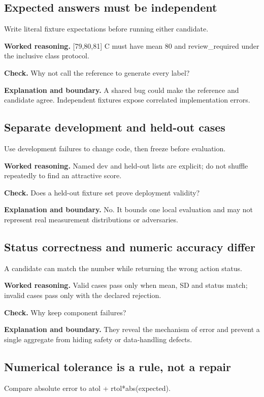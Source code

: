 \subsection{Expected answers must be independent}
Write literal fixture expectations before running either candidate.

\textbf{Worked reasoning.} [79,80,81] C must have mean 80 and review\_required under the inclusive class protocol.

\textbf{Check.} Why not call the reference to generate every label?

\textbf{Explanation and boundary.} A shared bug could make the reference and candidate agree. Independent fixtures expose correlated implementation errors.

\subsection{Separate development and held-out cases}
Use development failures to change code, then freeze before evaluation.

\textbf{Worked reasoning.} Named dev and held-out lists are explicit; do not shuffle repeatedly to find an attractive score.

\textbf{Check.} Does a held-out fixture set prove deployment validity?

\textbf{Explanation and boundary.} No. It bounds one local evaluation and may not represent real measurement distributions or adversaries.

\subsection{Status correctness and numeric accuracy differ}
A candidate can match the number while returning the wrong action status.

\textbf{Worked reasoning.} Valid cases pass only when mean, SD and status match; invalid cases pass only with the declared rejection.

\textbf{Check.} Why keep component failures?

\textbf{Explanation and boundary.} They reveal the mechanism of error and prevent a single aggregate from hiding safety or data-handling defects.

\subsection{Numerical tolerance is a rule, not a repair}
Compare absolute error to atol + rtol*abs(expected).


